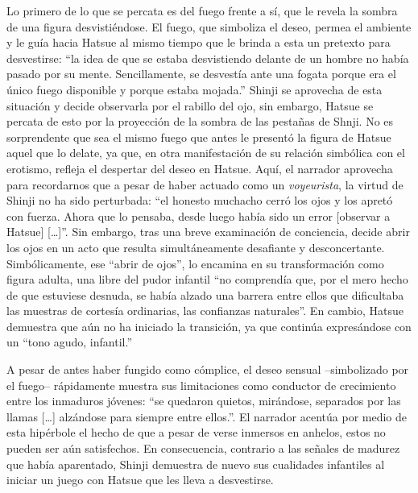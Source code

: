 Lo primero de lo que se percata es del fuego frente a sí, que le revela la sombra de una figura desvistiéndose. El fuego, que simboliza el deseo, permea el ambiente y le guía hacia Hatsue al mismo tiempo que le brinda a esta un pretexto para desvestirse: ``la idea de que se estaba desvistiendo delante de un hombre no había pasado por su mente. Sencillamente, se desvestía ante una fogata porque era el único fuego disponible y porque estaba mojada.'' \autocite{mishima2006}
Shinji se aprovecha de esta situación y decide observarla por el rabillo del ojo, sin embargo, Hatsue se percata de esto por la proyección de la sombra de las pestañas de Shnji.
No es sorprendente que sea el mismo fuego que antes le presentó la figura de Hatsue aquel que lo delate, ya que, en otra manifestación de su relación simbólica con el erotismo, refleja el despertar del deseo en Hatsue.
Aquí, el narrador aprovecha para recordarnos que a pesar de haber actuado como un \emph{voyeurista}, la virtud de Shinji no ha sido perturbada: ``el honesto muchacho cerró los ojos y los apretó con fuerza. Ahora que lo pensaba, desde luego había sido un error [observar a Hatsue] [\ldots]''\autocite{mishima2006}.
Sin embargo, tras una breve examinación de conciencia, decide abrir los ojos en un acto que resulta simultáneamente desafiante y desconcertante.
Simbólicamente, ese ``abrir de ojos'', lo encamina en su transformación como figura adulta, una libre del pudor infantil ``no comprendía que, por el mero hecho de que estuviese desnuda, se había alzado una barrera entre ellos que dificultaba las muestras de cortesía ordinarias, las confianzas naturales''.\autocite{mishima2006}
En cambio, Hatsue demuestra que aún no ha iniciado la transición, ya que continúa expresándose con un ``tono agudo, infantil.''\autocite{mishima2006}

A pesar de antes haber fungido como cómplice, el deseo sensual --simbolizado por el fuego-- rápidamente muestra sus limitaciones como conductor de crecimiento entre los inmaduros jóvenes: ``se quedaron quietos, mirándose, separados por las llamas [\ldots] alzándose para siempre entre ellos.''.\autocite{mishima2006}
El narrador acentúa por medio de esta hipérbole el hecho de que a pesar de verse inmersos en anhelos, estos no pueden ser aún satisfechos. En consecuencia, contrario a las señales de madurez que había aparentado, Shinji demuestra de nuevo sus cualidades infantiles al iniciar un juego con Hatsue que les lleva a desvestirse.

